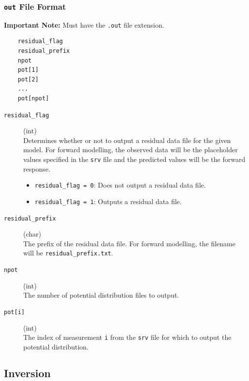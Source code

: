 \documentclass[a4paper,12pt]{article}
\begin{document}
\newpage
\subsubsection{\texttt{out} File Format} \label{forward_out}

\begin{framed}
    \noindent \textbf{Important Note:} Must have the \texttt{.out} file extension.
\end{framed}

\begin{framed}
    \begin{verbatim}
    residual_flag
    residual_prefix
    npot
    pot[1]
    pot[2]
    ...
    pot[npot]
\end{verbatim}
\end{framed}

\begin{description}
    \item[\texttt{residual\_flag}] (int)\hfill \\
          Determines whether or not to output a residual data file for the given model. For forward modelling, the observed data will be the placeholder values specified in the \texttt{srv} file and the predicted values will be the forward response.
          \begin{itemize}
              \item \texttt{residual\_flag = 0}: Does not output a residual data file.
              \item \texttt{residual\_flag = 1}: Outputs a residual data file.
          \end{itemize}

    \item[\texttt{residual\_prefix}] (char)\hfill \\
          The prefix of the residual data file. For forward modelling, the filename will be \texttt{residual\_prefix.txt}.

    \item[\texttt{npot}] (int)\hfill \\
          The number of potential distribution files to output.

    \item[\texttt{pot[i]}] (int)\hfill \\
          The index of measurement \texttt{i} from the \texttt{srv} file for which to output the potential distribution.
\end{description}

\newpage
\subsection{Inversion}
\end{document}
